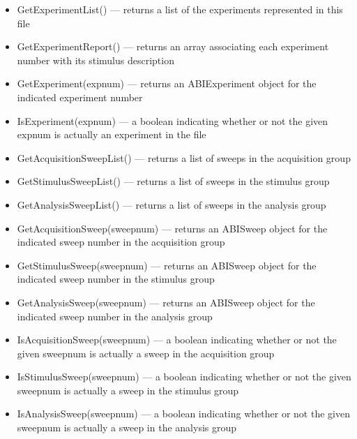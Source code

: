 \documentclass{article}
\begin{document}
\begin{itemize}
	\item GetExperimentList() --- returns a list of the experiments represented in this file
	\item GetExperimentReport() --- returns an array associating each experiment number with its stimulus description
	\item GetExperiment(expnum) --- returns an ABIExperiment object for the indicated experiment number 
	\item IsExperiment(expnum) --- a boolean indicating whether or not the given expnum is actually an experiment in the file 
	\item GetAcquisitionSweepList() --- returns a list of sweeps in the acquisition group
	\item GetStimulusSweepList() --- returns a list of sweeps in the stimulus group
	\item GetAnalysisSweepList() --- returns a list of sweeps in the analysis group
	\item GetAcquisitionSweep(sweepnum) --- returns an ABISweep object for the indicated sweep number in the acquisition group
	\item GetStimulusSweep(sweepnum) --- returns an ABISweep object for the indicated sweep number in the stimulus group
	\item GetAnalysisSweep(sweepnum) --- returns an ABISweep object for the indicated sweep number in the analysis group
	\item IsAcquisitionSweep(sweepnum) --- a boolean indicating whether or not the given sweepnum is actually a sweep in the acquisition group
	\item IsStimulusSweep(sweepnum) --- a boolean indicating whether or not the given sweepnum is actually a sweep in the stimulus group
	\item IsAnalysisSweep(sweepnum) --- a boolean indicating whether or not the given sweepnum is actually a sweep in the analysis group
\end{itemize}
\end{document}
